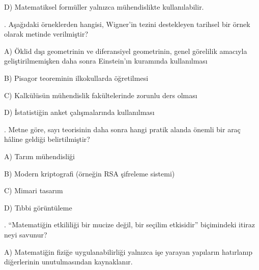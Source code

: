 \par\noindent\hspace*{1.6em}D) Matematiksel formüller yalnızca mühendislikte kullanılabilir.

\par\smallskip{}. Aşağıdaki örneklerden hangisi, Wigner’in tezini destekleyen tarihsel bir örnek olarak metinde verilmiştir?

\par\noindent\hspace*{1.6em}A) Öklid dışı geometrinin ve diferansiyel geometrinin, genel görelilik amacıyla geliştirilmemişken daha sonra Einstein’ın kuramında kullanılması

\par\noindent\hspace*{1.6em}B) Pisagor teoreminin ilkokullarda öğretilmesi

\par\noindent\hspace*{1.6em}C) Kalkülüsün mühendislik fakültelerinde zorunlu ders olması

\par\noindent\hspace*{1.6em}D) İstatistiğin anket çalışmalarında kullanılması

\par\smallskip{}. Metne göre, sayı teorisinin daha sonra hangi pratik alanda önemli bir araç hâline geldiği belirtilmiştir?

\par\noindent\hspace*{1.6em}A) Tarım mühendisliği

\par\noindent\hspace*{1.6em}B) Modern kriptografi (örneğin RSA şifreleme sistemi)

\par\noindent\hspace*{1.6em}C) Mimari tasarım

\par\noindent\hspace*{1.6em}D) Tıbbi görüntüleme

\par\smallskip{}. “Matematiğin etkililiği bir mucize değil, bir seçilim etkisidir” biçimindeki itiraz neyi savunur?

\par\noindent\hspace*{1.6em}A) Matematiğin fiziğe uygulanabilirliği yalnızca işe yarayan yapıların hatırlanıp diğerlerinin unutulmasından kaynaklanır.

